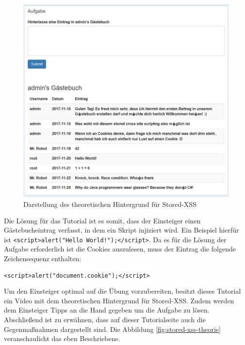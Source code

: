 \begin{figure}[H]
	\centering
	\includegraphics[width=\textwidth]{images/XSS/stored-xss-aufgabe.jpg}
	\caption{Darstellung des theoretischen Hintergrund für Stored-XSS}
	\label{fig:stored-xss-aufgabe}
\end{figure}

Die Lösung für das Tutorial ist es somit, dass der Einsteiger einen Gästebucheintrag verfasst, in dem ein Skript injiziert wird. Ein Beispiel hierfür ist \colorbox{altgray}{\lstinline|<script>alert("Hello World!");</script>|}. Da es für die Lösung der Aufgabe erforderlich ist die Cookies auszulesen, muss der Eintrag die folgende Zeichensequenz enthalten: 
\begin{center} 
\colorbox{altgray}{\lstinline|<script>alert("document.cookie");</script>|} 
\end{center}

Um den Einsteiger optimal auf die Übung vorzubereiten, besitzt dieses Tutorial ein Video mit dem theoretischen Hintergrund für Stored-XSS. Zudem werden dem Einsteiger Tipps an die Hand gegeben um die Aufgabe zu lösen. Abschließend ist zu erwähnen, dass auf dieser Tutorialseite auch die Gegenmaßnahmen dargestellt sind. Die Abbildung \ref{fig:stored-xss-theorie} veranschaulicht das eben Beschriebene. 

